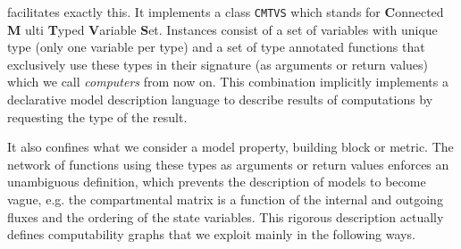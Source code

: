 \ComputabilityGraphs{} facilitates exactly this.
It implements a class \texttt{CMTVS} which stands for 
{\bf C}onnected {\bf M} ulti {\bf T}yped {\bf V}ariable {\bf S}et. 
Instances consist of a set of variables with unique type (only one variable per type) and a set of type annotated functions that exclusively 
use these types in their signature (as arguments or return values) which we call \emph{computers} from now on.
This combination implicitly implements a declarative model description language to describe results of computations by requesting the type of the result. 

It also confines what we consider a model property, building block or
metric. The network of functions using these types as arguments or return values
enforces an unambiguous definition, which prevents the description of models to
become vague, e.g. the compartmental matrix is a function of the internal and outgoing fluxes and the ordering of the state variables.  
This rigorous description actually defines computability graphs that we exploit mainly in the following ways.
